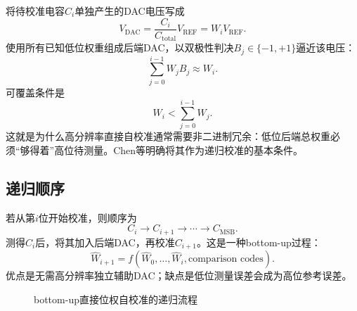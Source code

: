 \documentclass[UTF8,a4paper,11pt]{ctexart}
\newcommand{\Vref}{V_{\mathrm{REF}}}
\begin{document}
将待校准电容$C_i$单独产生的DAC电压写成
\begin{equation}
V_{\mathrm{DAC}}=\frac{C_i}{C_{\mathrm{total}}}\Vref=W_i\Vref.
\end{equation}
使用所有已知低位权重组成后端DAC，以双极性判决$B_j\in\{-1,+1\}$逼近该电压：
\begin{equation}
\sum_{j=0}^{i-1}W_jB_j\approx W_i.
\label{eq:backend_quant}
\end{equation}
可覆盖条件是
\begin{equation}
W_i<\sum_{j=0}^{i-1}W_j.
\label{eq:redundancy_condition}
\end{equation}
这就是为什么高分辨率直接自校准通常需要非二进制冗余：低位后端总权重必须“够得着”高位待测量。Chen等明确将其作为递归校准的基本条件。\cite{chen2024}

\subsection{递归顺序}

若从第$i$位开始校准，则顺序为
\begin{equation}
C_i\rightarrow C_{i+1}\rightarrow\cdots\rightarrow C_{\mathrm{MSB}}.
\end{equation}
测得$C_i$后，将其加入后端DAC，再校准$C_{i+1}$。这是一种bottom-up过程：
\begin{equation}
\widehat W_{i+1}=f(\widehat W_0,\ldots,\widehat W_i,\text{comparison codes}).
\end{equation}
优点是无需高分辨率独立辅助DAC；缺点是低位测量误差会成为高位参考误差。

\begin{figure}[H]
\centering
{}
\caption{bottom-up直接位权自校准的递归流程}
\end{figure}
\end{document}
